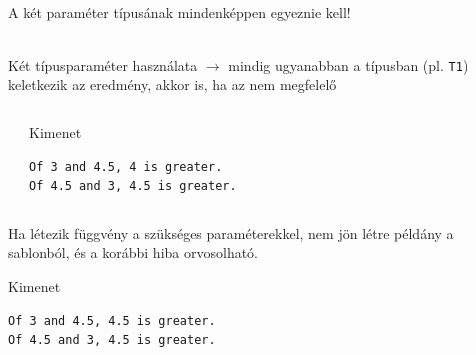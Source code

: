 \documentclass[usenames,dvipsnames,aspectratio=169]{beamer}
\begin{document}
\begin{frame}
    \begin{description}[m]
        \item[Probléma:] \hfill \\ A két paraméter típusának mindenképpen egyeznie kell!
        \item[Félmegoldás:] \hfill \\ Két típusparaméter használata $\to$ mindig ugyanabban a típusban (pl. \texttt{T1}) keletkezik az eredmény, akkor is, ha az nem megfelelő
    \end{description}
\end{frame}

\begin{frame}[fragile]
    \begin{columns}[T]
            \begin{exampleblock}{}
                \scriptsize
                
            \end{exampleblock}
            \begin{block}{Kimenet}
                \footnotesize
                \vspace{-.4cm}
                \begin{verbatim}
Of 3 and 4.5, 4 is greater.
Of 4.5 and 3, 4.5 is greater.                    
                \end{verbatim}
                \vspace{-.4cm}
            \end{block}
    \end{columns}
\end{frame}

\begin{frame}[fragile]
    Ha létezik függvény a szükséges paraméterekkel, nem jön létre példány a sablonból, és a korábbi hiba orvosolható.
    \begin{exampleblock}{}
        \scriptsize
        
    \end{exampleblock}
    \begin{block}{Kimenet}
        \footnotesize
        \vspace{-.4cm}
        \begin{verbatim}
Of 3 and 4.5, 4.5 is greater.
Of 4.5 and 3, 4.5 is greater.
        \end{verbatim}
        \vspace{-.4cm}
    \end{block}
\end{frame}
\end{document}
